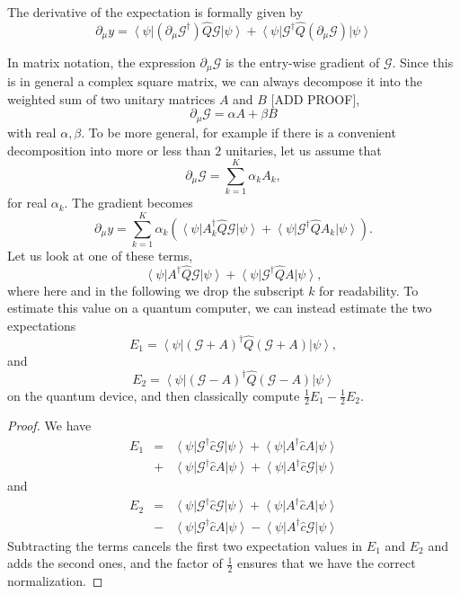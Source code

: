 \documentclass[aps,pra,10pt,twocolumn,groupedaddress,nofootinbib]{revtex4-1}
\theoremstyle{plain}
\newcommand{\ket}[1]{\ensuremath{\left| #1 \right \rangle}}
\newcommand{\bra}[1]{\ensuremath{\left \langle #1 \right |}}
\newcommand{\G}{\mathcal{G}}
\begin{document}
The derivative of the expectation is formally given by
\begin{equation}
	\partial_{\mu} y = \bra{\psi} ( \partial_{\mu}\G^{\dagger})  \hat{Q} \G \ket{\psi} + \bra{\psi} \G^{\dagger}  \hat{Q}  (\partial_{\mu}\G) \ket{\psi}
	\label{Eq:der_of_exp}
\end{equation}

In matrix notation, the expression $\partial_{\mu}\G$ is the entry-wise gradient of $\G$. Since this is in general a complex square matrix, we can always decompose it into the weighted sum of two unitary matrices $A$ and $B$ [ADD PROOF],
\[\partial_{\mu}\G = \alpha A + \beta B \]
with real $\alpha, \beta$. To be more general, for example if there is a convenient decomposition into more or less than $2$ unitaries, let us assume that
\begin{equation} 
	\partial_{\mu}\G = \sum_{k=1}^K \alpha_k A_k, 
	\label{Eq:deriv_decomp}
\end{equation}
for real $\alpha_k$. The gradient becomes
\begin{equation}
	\partial_{\mu} y  = \sum_{k=1}^K \alpha_k  \left( \bra{\psi} A_k^{\dagger}  \hat{Q} \G \ket{\psi} +  \bra{\psi}\G^{\dagger} \hat{Q} A_k  \ket{\psi} \right).
	\label{Eq:gradient_decomp}
\end{equation}
Let us look at one of these terms,
\begin{equation}
	\bra{\psi} A^{\dagger}  \hat{Q} \G \ket{\psi} +  \bra{\psi}\G^{\dagger} \hat{Q} A  \ket{\psi},
\label{Eq:term_to_estimate}
\end{equation}
where here and in the following we drop the subscript $k$ for readability. To estimate this value on a quantum computer, we can instead estimate the two expectations
\begin{equation}
	E_1 = \bra{\psi} (\G + A)^{\dagger} \hat{Q} (\G + A) \ket{\psi},		\label{Eq:E1}
\end{equation}
and
\begin{equation}
	E_2= \bra{\psi}(\G - A)^{\dagger}  \hat{Q} (\G - A) \ket{\psi}
	\label{Eq:E2}
\end{equation}
on the quantum device, and then classically compute $\frac{1}{2}E_1 - \frac{1}{2} E_2$.
\begin{proof}
We have
\begin{eqnarray*}
	E_1 &= &\bra{\psi} \G^{\dagger} \hat{c} \G \ket{\psi} + \bra{\psi} A^{\dagger} \hat{c} A \ket{\psi} \\
	&+& \bra{\psi} \G^{\dagger} \hat{c} A \ket{\psi}+ \bra{\psi} A^{\dagger} \hat{c} \G \ket{\psi}
\end{eqnarray*}
and
\begin{eqnarray*}
	E_2 &= & \bra{\psi} \G^{\dagger} \hat{c} \G \ket{\psi} + \bra{\psi} A^{\dagger} \hat{c} A \ket{\psi} \\
	&-& \bra{\psi} \G^{\dagger} \hat{c} A \ket{\psi}- \bra{\psi} A^{\dagger} \hat{c} \G \ket{\psi}
\end{eqnarray*}
Subtracting the terms cancels the first two expectation values in $E_1$ and $E_2$ and adds the second ones, and the factor of $\frac{1}{2}$ ensures that we have the correct normalization.
\end{proof}
\end{document}
